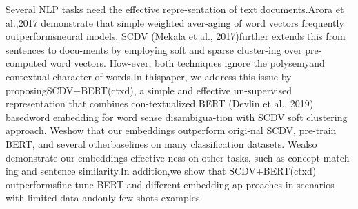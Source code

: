 Several NLP  tasks  need  the  effective  repre-sentation  of  text  documents.Arora  et  al.,2017  demonstrate  that  simple  weighted  aver-aging of word vectors frequently outperformsneural  models.   SCDV  (Mekala  et  al.,  2017)further  extends  this  from  sentences  to  docu-ments  by  employing  soft  and  sparse  cluster-ing  over  pre-computed  word  vectors.    How-ever,   both  techniques  ignore  the  polysemyand  contextual  character  of  words.In  thispaper,   we  address  this  issue  by  proposingSCDV+BERT(ctxd), a simple and effective un-supervised  representation  that  combines  con-textualized BERT (Devlin et al., 2019) basedword  embedding  for  word  sense  disambigua-tion with SCDV soft clustering approach.  Weshow  that  our  embeddings  outperform  origi-nal SCDV, pre-train BERT, and several otherbaselines on many classification datasets.  Wealso  demonstrate  our  embeddings  effective-ness  on  other  tasks,  such  as  concept  match-ing   and   sentence   similarity.In   addition,we show that SCDV+BERT(ctxd) outperformsfine-tune  BERT  and  different  embedding  ap-proaches  in  scenarios  with  limited  data  andonly few shots examples.
